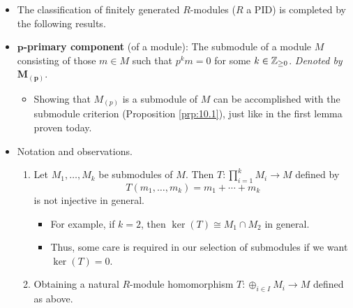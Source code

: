 \documentclass[../notes.tex]{subfiles}
\begin{document}
\begin{itemize}
\begin{enumerate}[label={(\roman*)}]
    \end{enumerate}
    \begin{proof}
        Suppose first that $\phi:M_1\to M_2$ is an isomorphism. Then naturally they will have the same ranks and torsion submodules.\par
        On the other hand, if $\rank(M_1)=\rank(M_2)$, then $M_1/\Tor(M_1)\cong M_2/\Tor(M_2)$. This combined with the hypothesis that $\Tor(M_1)\cong\Tor(M_2)$ implies that
        \begin{align*}
            \Tor(M_1)\oplus M_1/\Tor(M_1) &\cong \Tor(M_2)\oplus M_2/\Tor(M_2)\\
            M_1 &\cong M_2
        \end{align*}
        where the second line follows from the preceding theorem.
    \end{proof}
    \item The classification of finitely generated $R$-modules ($R$ a PID) is completed by the following results.
    \item \textbf{$\bm{p}$-primary component} (of a module): The submodule of a module $M$ consisting of those $m\in M$ such that $p^km=0$ for some $k\in{\mathbb{Z}_{\geq 0}}$. \emph{Denoted by} $\bm{M_{(p)}}$.
    \begin{itemize}
        \item Showing that $M_{(p)}$ is a submodule of $M$ can be accomplished with the submodule criterion (Proposition \ref{prp:10.1}), just like in the first lemma proven today.
    \end{itemize}
    \item Notation and observations.
    \begin{enumerate}
        \item Let $M_1,\dots,M_k$ be submodules of $M$. Then $T:\prod_{i=1}^kM_i\to M$ defined by
        \begin{equation*}
            T(m_1,\dots,m_k) = m_1+\cdots+m_k
        \end{equation*}
        is not injective in general.
        \begin{itemize}
            \item For example, if $k=2$, then $\ker(T)\cong M_1\cap M_2$ in general.
            \item Thus, some care is required in our selection of submodules if we want $\ker(T)=0$.
        \end{itemize}
        \item Obtaining a natural $R$-module homomorphism $T:\oplus_{i\in I}M_i\to M$ defined as above.

\end{enumerate}
\end{itemize}
\end{document}
